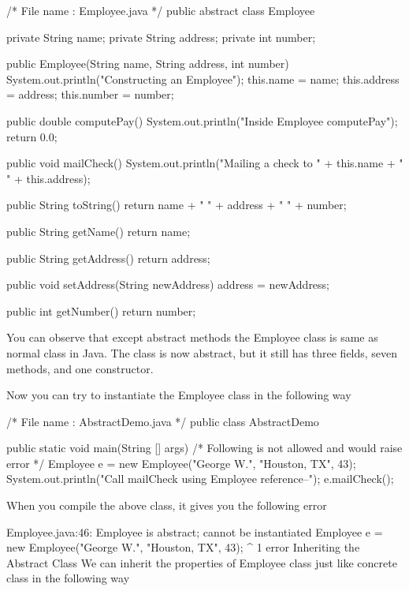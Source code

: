 /* File name : Employee.java */
public abstract class Employee {
   private String name;
   private String address;
   private int number;

   public Employee(String name, String address, int number) {
      System.out.println("Constructing an Employee");
      this.name = name;
      this.address = address;
      this.number = number;
   }

   public double computePay() {
     System.out.println("Inside Employee computePay");
     return 0.0;
   }

   public void mailCheck() {
      System.out.println("Mailing a check to " + this.name + " " + this.address);
   }

   public String toString() {
      return name + " " + address + " " + number;
   }

   public String getName() {
      return name;
   }

   public String getAddress() {
      return address;
   }

   public void setAddress(String newAddress) {
      address = newAddress;
   }

   public int getNumber() {
      return number;
   }
}
You can observe that except abstract methods the Employee class is same as normal class in Java. The class is now abstract, but it still has three fields, seven methods, and one constructor.

Now you can try to instantiate the Employee class in the following way

/* File name : AbstractDemo.java */
public class AbstractDemo {

   public static void main(String [] args) {
      /* Following is not allowed and would raise error */
      Employee e = new Employee("George W.", "Houston, TX", 43);
      System.out.println("\n Call mailCheck using Employee reference--");
      e.mailCheck();
   }
}
When you compile the above class, it gives you the following error

Employee.java:46: Employee is abstract; cannot be instantiated
      Employee e = new Employee("George W.", "Houston, TX", 43);
                   ^
1 error
Inheriting the Abstract Class
We can inherit the properties of Employee class just like concrete class in the following way


